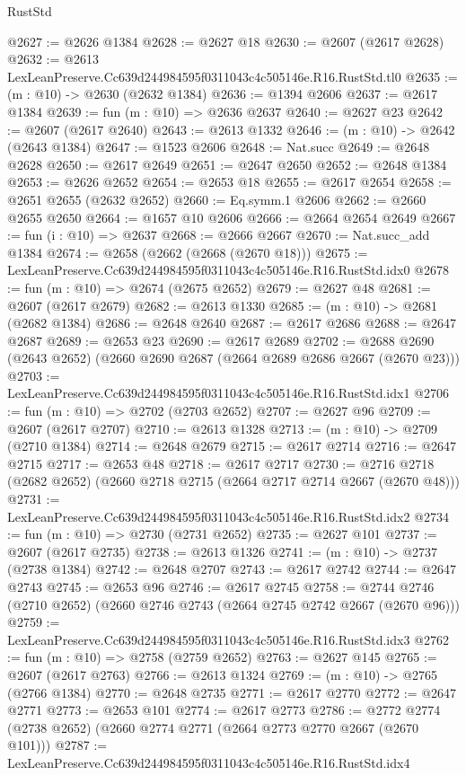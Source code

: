 \begin{lexlean}{RustStd}
\begin{coremodule}
@2627 := @2626 @1384
@2628 := @2627 @18
@2630 := @2607 (@2617 @2628)
@2632 := @2613 LexLeanPreserve.Cc639d244984595f0311043c4c505146e.R16.RustStd.tl0
@2635 := (m : @10) -> @2630 (@2632 @1384)
@2636 := @1394 @2606
@2637 := @2617 @1384
@2639 := fun (m : @10) => @2636 @2637
@2640 := @2627 @23
@2642 := @2607 (@2617 @2640)
@2643 := @2613 @1332
@2646 := (m : @10) -> @2642 (@2643 @1384)
@2647 := @1523 @2606
@2648 := Nat.succ
@2649 := @2648 @2628
@2650 := @2617 @2649
@2651 := @2647 @2650
@2652 := @2648 @1384
@2653 := @2626 @2652
@2654 := @2653 @18
@2655 := @2617 @2654
@2658 := @2651 @2655 (@2632 @2652)
@2660 := Eq.symm.{1} @2606
@2662 := @2660 @2655 @2650
@2664 := @1657 @10 @2606
@2666 := @2664 @2654 @2649
@2667 := fun (i : @10) => @2637
@2668 := @2666 @2667
@2670 := Nat.succ_add @1384
@2674 := @2658 (@2662 (@2668 (@2670 @18)))
@2675 := LexLeanPreserve.Cc639d244984595f0311043c4c505146e.R16.RustStd.idx0
@2678 := fun (m : @10) => @2674 (@2675 @2652)
@2679 := @2627 @48
@2681 := @2607 (@2617 @2679)
@2682 := @2613 @1330
@2685 := (m : @10) -> @2681 (@2682 @1384)
@2686 := @2648 @2640
@2687 := @2617 @2686
@2688 := @2647 @2687
@2689 := @2653 @23
@2690 := @2617 @2689
@2702 := @2688 @2690 (@2643 @2652) (@2660 @2690 @2687 (@2664 @2689 @2686 @2667 (@2670 @23)))
@2703 := LexLeanPreserve.Cc639d244984595f0311043c4c505146e.R16.RustStd.idx1
@2706 := fun (m : @10) => @2702 (@2703 @2652)
@2707 := @2627 @96
@2709 := @2607 (@2617 @2707)
@2710 := @2613 @1328
@2713 := (m : @10) -> @2709 (@2710 @1384)
@2714 := @2648 @2679
@2715 := @2617 @2714
@2716 := @2647 @2715
@2717 := @2653 @48
@2718 := @2617 @2717
@2730 := @2716 @2718 (@2682 @2652) (@2660 @2718 @2715 (@2664 @2717 @2714 @2667 (@2670 @48)))
@2731 := LexLeanPreserve.Cc639d244984595f0311043c4c505146e.R16.RustStd.idx2
@2734 := fun (m : @10) => @2730 (@2731 @2652)
@2735 := @2627 @101
@2737 := @2607 (@2617 @2735)
@2738 := @2613 @1326
@2741 := (m : @10) -> @2737 (@2738 @1384)
@2742 := @2648 @2707
@2743 := @2617 @2742
@2744 := @2647 @2743
@2745 := @2653 @96
@2746 := @2617 @2745
@2758 := @2744 @2746 (@2710 @2652) (@2660 @2746 @2743 (@2664 @2745 @2742 @2667 (@2670 @96)))
@2759 := LexLeanPreserve.Cc639d244984595f0311043c4c505146e.R16.RustStd.idx3
@2762 := fun (m : @10) => @2758 (@2759 @2652)
@2763 := @2627 @145
@2765 := @2607 (@2617 @2763)
@2766 := @2613 @1324
@2769 := (m : @10) -> @2765 (@2766 @1384)
@2770 := @2648 @2735
@2771 := @2617 @2770
@2772 := @2647 @2771
@2773 := @2653 @101
@2774 := @2617 @2773
@2786 := @2772 @2774 (@2738 @2652) (@2660 @2774 @2771 (@2664 @2773 @2770 @2667 (@2670 @101)))
@2787 := LexLeanPreserve.Cc639d244984595f0311043c4c505146e.R16.RustStd.idx4

\end{coremodule}
\end{lexlean}

